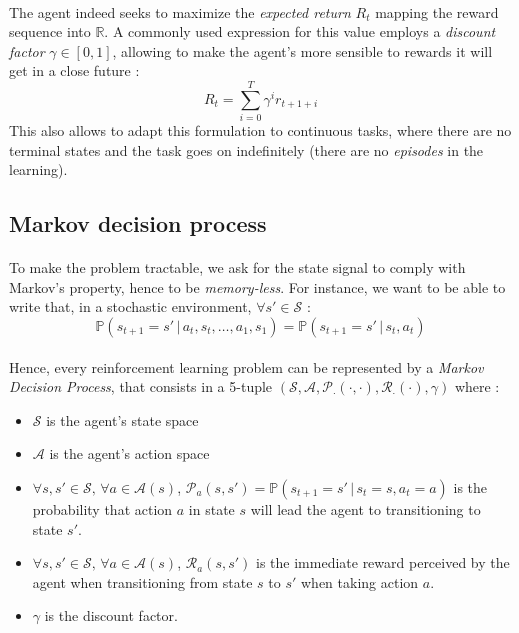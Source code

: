 \documentclass[a4paper]{report}
\begin{document}
{{{				\paragraph{} The agent indeed seeks to maximize the \emph{expected return} $R_t$ mapping the reward sequence into $\mathbb{R}$. A commonly used expression for this value employs a \emph{discount factor} $\gamma \in [0,1]$, allowing to make the agent's more sensible to rewards it will get in a close future : 
				\begin{equation}
					R_t = \sum_{i=0}^T \gamma^i r_{t+1+i}
				\end{equation}
				This also allows to adapt this formulation to continuous tasks, where there are no terminal states and the task goes on indefinitely (there are no \emph{episodes} in the learning). 
				
			}
			\subsection{Markov decision process}
			{
				\paragraph{} To make the problem tractable, we ask for the state signal to comply with Markov's property, hence to be \emph{memory-less}. For instance, we want to be able to write that, in a stochastic environment, $\forall s'\in\mathcal{S}$ : 
				\begin{equation}
					\mathbb{P}\left( s_{t+1}=s' \, \vert \, a_t, s_t, \hdots, a_1,s_1\right) = \mathbb{P}\left( s_{t+1}=s' \, \vert \, s_t, a_t\right)
				\end{equation}
				
				\paragraph{} Hence, every reinforcement learning problem can be represented by a \emph{Markov Decision Process}, that consists in a 5-tuple $\left(\mathcal{S}, \mathcal{A}, \mathcal{P}_{\cdot}(\cdot,\cdot), \mathcal{R}_{\cdot}(\cdot), \gamma \right)$ where : 
				\begin{itemize}[label=$\triangleright$]
					\item $\mathcal{S}$ is the agent's state space
					\item $\mathcal{A}$ is the agent's action space
					\item $\forall s,s'\in\mathcal{S}, \, \forall a\in\mathcal{A}(s)$,  $\mathcal{P}_a(s,s') = \mathbb{P}(s_{t+1}=s'\, \vert \, s_t = s, a_t = a)$ is the probability that action $a$ in state $s$ will lead the agent to transitioning to state $s'$.
					\item $\forall s,s'\in\mathcal{S}, \, \forall a\in\mathcal{A}(s)$,  $\mathcal{R}_a(s,s')$ is the immediate reward perceived by the agent when transitioning from state $s$ to $s'$ when taking action $a$. 
					\item $\gamma$ is the discount factor. 
				\end{itemize}
				
}}}
\end{document}
